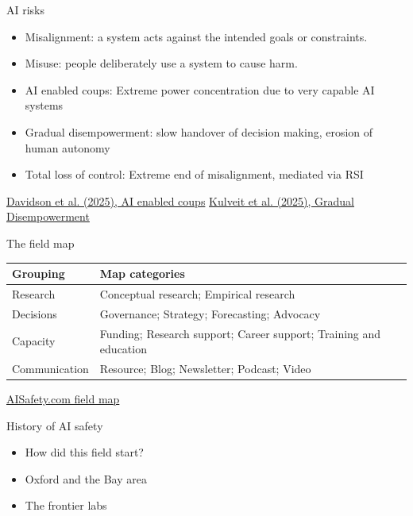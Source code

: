 \documentclass[aspectratio=169,11pt]{beamer}
\newcommand{\sources}[1]{\vfill{\fontsize{6.3}{7.5}\selectfont\color{muted}#1\par}}
\begin{document}
\begin{frame}[t,label=riskmap]{AI risks }
\begin{itemize}\setlength{\itemsep}{3.5mm}
\item Misalignment: a system acts against the intended goals or constraints.
\item Misuse: people deliberately use a system to cause harm.
\item AI enabled coups: Extreme power concentration due to very capable AI systems
\item Gradual disempowerment: slow handover of decision making, erosion of human autonomy
\item Total loss of control: Extreme end of misalignment, mediated via RSI

\end{itemize}
\sources{\href{https://www.forethought.org/research/ai-enabled-coups-how-a-small-group-could-use-ai-to-seize-power}{Davidson et al. (2025), AI enabled coups} \quad \href{https://gradual-disempowerment.ai/}{Kulveit et al. (2025), Gradual Disempowerment}}
\end{frame}


\begin{frame}[t,label=mapoverview]{The field map}
\normalsize\renewcommand{\arraystretch}{1.38}\setlength{\tabcolsep}{3pt}
\begin{tabular}{@{}>{\raggedright\arraybackslash}p{}>{\raggedright\arraybackslash}p{}@{}}\toprule
\textbf{Grouping} & \textbf{Map categories}\\\midrule
Research & Conceptual research; Empirical research\\
Decisions & Governance; Strategy; Forecasting; Advocacy\\
Capacity & Funding; Research support; Career support; Training and education\\
Communication & Resource; Blog; Newsletter; Podcast; Video\\
\bottomrule\end{tabular}
\sources{\href{https://aisafety.com/map}{AISafety.com field map}}
\end{frame}

\begin{frame}[t,label=mapoverview]{History of AI safety}
\begin{itemize}\setlength{\itemsep}{3.5mm}
\item How did this field start?
\item Oxford and the Bay area
\item The frontier labs
\end{itemize}
\end{frame}
\end{document}
